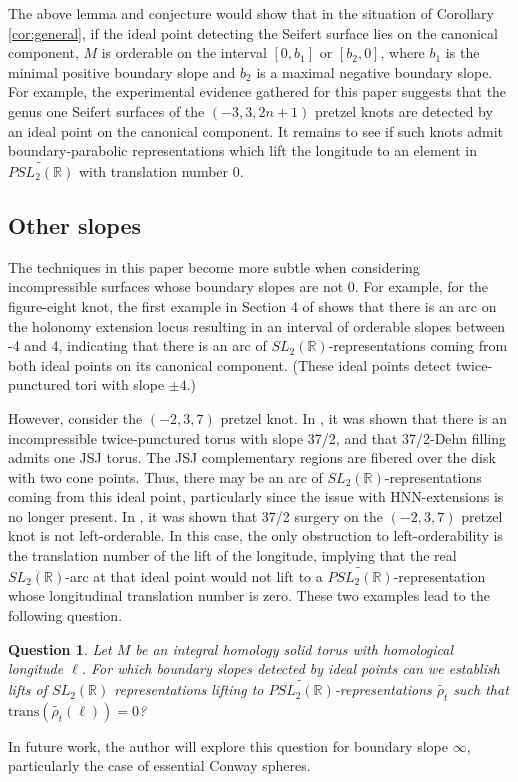 \documentclass{article}
\theoremstyle{plain}
\theoremstyle{definition}
\theoremstyle{plain}
\theoremstyle{plain}
\theoremstyle{plain}
\theoremstyle{remark}
\theoremstyle{remark}
\theoremstyle{plain}
\theoremstyle{plain}
\newtheorem{question}[theorem]{Question}
\begin{document}
The above lemma and conjecture would show that in the situation of Corollary \ref{cor:general}, if the ideal point detecting the Seifert surface lies on the canonical component, $M$ is orderable on the interval $[0, b_1]$ or $[b_2, 0]$, where $b_1$ is the minimal positive boundary slope and $b_2$ is a maximal negative boundary slope. For example, the experimental evidence gathered for this paper suggests that the genus one Seifert surfaces of the $(-3, 3, 2n+1)$ pretzel knots are detected by an ideal point on the canonical component. It remains to see if such knots admit boundary-parabolic representations which lift the longitude to an element in $\widetilde{PSL_2(\mathbb{R})}$ with translation number 0.

\subsection{Other slopes}

The techniques in this paper become more subtle when considering incompressible surfaces whose boundary slopes are not 0. For example, for the figure-eight knot, the first example in Section 4 of \cite{gao} shows that there is an arc on the holonomy extension locus resulting in an interval of orderable slopes between -4 and 4, indicating that there is an arc of $SL_2(\mathbb{R})$-representations coming from both ideal points on its canonical component. (These ideal points detect twice-punctured tori with slope $\pm 4$.)

\medskip

However, consider the $(-2, 3, 7)$ pretzel knot. In \cite{gordonluecke}, it was shown that there is an incompressible twice-punctured torus with slope 37/2, and that 37/2-Dehn filling admits one JSJ torus. The JSJ complementary regions are fibered over the disk with two cone points. Thus, there may be an arc of $SL_2(\mathbb{R})$-representations coming from this ideal point, particularly since the issue with HNN-extensions is no longer present. In \cite{niepretzel}, it was shown that 37/2 surgery on the $(-2, 3, 7)$ pretzel knot is not left-orderable. In this case, the only obstruction to left-orderability is the translation number of the lift of the longitude, implying that the real $SL_2(\mathbb{R})$-arc at that ideal point would not lift to a $\widetilde{PSL_2(\mathbb{R})}$-representation whose longitudinal translation number is zero. These two examples lead to the following question.

\begin{question}
Let $M$ be an integral homology solid torus with homological longitude $\ell$. For which boundary slopes detected by ideal points can we establish lifts of $SL_2(\mathbb{R})$ representations lifting to $\widetilde{PSL_2(\mathbb{R})}$-representations $\widetilde{\rho_t}$ such that $\text{trans}(\widetilde{\rho_t}(\ell)) = 0$?
\end{question}

In future work, the author will explore this question for boundary slope $\infty$, particularly the case of essential Conway spheres.



	
\end{document}
